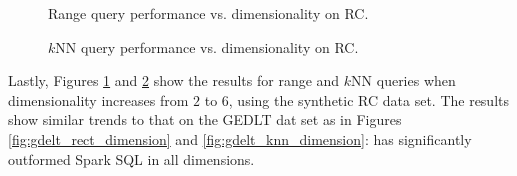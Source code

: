 \begin{appendix}
\begin{figure}[h!]
	\centering
	\caption{\small Range query performance vs. dimensionality on RC.}
	\label{fig:rc_rect_dimension} %
\end{figure}

\begin{figure}[h!]
	\centering
	\caption{\small $k$NN query performance vs. dimensionality on RC.}
	\label{fig:rc_knn_dimension} %
\end{figure}
Lastly, Figures \ref{fig:rc_rect_dimension} and \ref{fig:rc_knn_dimension}
show the results for range and $k$NN queries when dimensionality
increases from $2$ to $6$, using the synthetic RC data set. The
results show similar trends to that on the GEDLT dat set as in Figures
\ref{fig:gdelt_rect_dimension} and \ref{fig:gdelt_knn_dimension}: \name has significantly
outformed Spark SQL in all dimensions.

\end{appendix}

